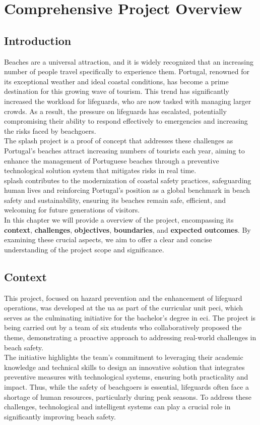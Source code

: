 \chapter{Comprehensive Project Overview}
\label{chapter:overview}

\section{Introduction}
\label{section:intro}
Beaches are a universal attraction, and it is widely recognized that an increasing number of people travel specifically to experience them. Portugal, renowned for its exceptional weather and ideal coastal conditions, has become a prime destination for this growing wave of tourism. This trend has significantly increased the workload for lifeguards, who are now tasked with managing larger crowds. As a result, the pressure on lifeguards has escalated, potentially compromising their ability to respond effectively to emergencies and increasing the risks faced by beachgoers.
\\
The \ac{splash} project is a proof of concept that addresses these challenges as Portugal’s beaches attract increasing numbers of tourists each year, aiming to enhance the management of Portuguese beaches through a preventive technological solution system that mitigates risks in real time.
\\
\ac{splash} contributes to the modernization of coastal safety practices, safeguarding human lives and reinforcing Portugal's position as a global benchmark in beach safety and sustainability, ensuring its beaches remain safe, efficient, and welcoming for future generations of visitors.
\\
In this chapter we will provide a overview of the project, encompassing its \textbf{context}, \textbf{challenges}, \textbf{objectives}, \textbf{boundaries}, and \textbf{expected outcomes}. By examining these crucial aspects, we aim to offer a clear and concise understanding of the project scope and significance.

\section{Context}
\label{section:context}

This project, focused on hazard prevention and the enhancement of lifeguard operations, was developed at the \ac{ua} as part of the curricular unit \ac{peci}, which serves as the culminating initiative for the bachelor's degree in \ac{eci}. The project is being carried out by a team of six students who collaboratively proposed the theme, demonstrating a proactive approach to addressing real-world challenges in beach safety. 
\\
The initiative highlights the team's commitment to leveraging their academic knowledge and technical skills to design an innovative solution that integrates preventive measures with technological systems, ensuring both practicality and impact. Thus, while the safety of beachgoers is essential, lifeguards often face a shortage of human resources, particularly during peak seasons. To address these challenges, technological and intelligent systems can play a crucial role in significantly improving beach safety.


